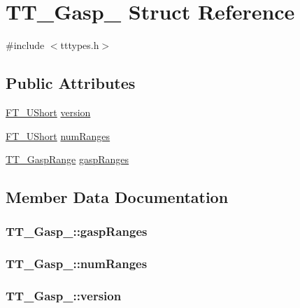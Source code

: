 \hypertarget{struct_t_t___gasp__}{\section{T\-T\-\_\-\-Gasp\-\_\- Struct Reference}
\label{struct_t_t___gasp__}
}


{\ttfamily \#include $<$tttypes.\-h$>$}

\subsection*{Public Attributes}
\begin{DoxyCompactItemize}
\item 
\hyperlink{fttypes_8h_a937f6c17cf5ffd09086d8610c37b9f58}{F\-T\-\_\-\-U\-Short} \hyperlink{struct_t_t___gasp___a0166777999a11a32068418ed6cf0caf8}{version}
\item 
\hyperlink{fttypes_8h_a937f6c17cf5ffd09086d8610c37b9f58}{F\-T\-\_\-\-U\-Short} \hyperlink{struct_t_t___gasp___a03f6dc693ebee0fedc055ac0981ee776}{num\-Ranges}
\item 
\hyperlink{tttypes_8h_a66136e5feadbe82157028caa94a11a36}{T\-T\-\_\-\-Gasp\-Range} \hyperlink{struct_t_t___gasp___a50240e84cfd7fc79ae1f2996ecb2a5d1}{gasp\-Ranges}
\end{DoxyCompactItemize}


\subsection{Member Data Documentation}
\hypertarget{struct_t_t___gasp___a50240e84cfd7fc79ae1f2996ecb2a5d1}{
\subsubsection[{gasp\-Ranges}]{ T\-T\-\_\-\-Gasp\-\_\-\-::gasp\-Ranges}}\label{struct_t_t___gasp___a50240e84cfd7fc79ae1f2996ecb2a5d1}
\hypertarget{struct_t_t___gasp___a03f6dc693ebee0fedc055ac0981ee776}{
\subsubsection[{num\-Ranges}]{ T\-T\-\_\-\-Gasp\-\_\-\-::num\-Ranges}}\label{struct_t_t___gasp___a03f6dc693ebee0fedc055ac0981ee776}
\hypertarget{struct_t_t___gasp___a0166777999a11a32068418ed6cf0caf8}{
\subsubsection[{version}]{ T\-T\-\_\-\-Gasp\-\_\-\-::version}}\label{struct_t_t___gasp___a0166777999a11a32068418ed6cf0caf8}


